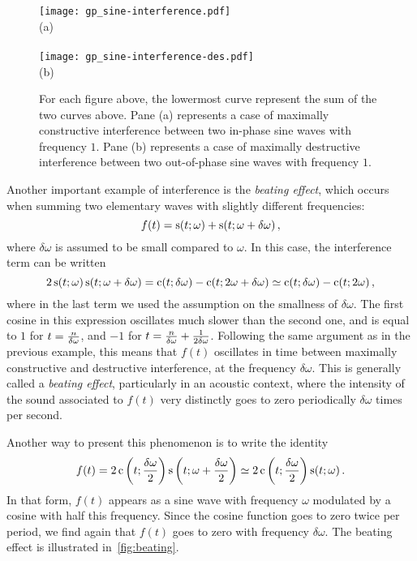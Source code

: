 \begin{figure}[ph!]
  \centering
  \texttt{[image: gp\_sine-interference.pdf]}
  \\\hspace{0.2cm}(a)\\~\\
  \texttt{[image: gp\_sine-interference-des.pdf]}
  \\\hspace{0.2cm}(b)\\
  \caption{For each figure above, the lowermost curve represent the sum of the two curves
    above. Pane (a) represents a case of maximally constructive interference between two
    in-phase sine waves with frequency $1$. Pane (b) represents a case of maximally
  destructive interference between two out-of-phase sine waves with frequency $1$.}
  \label{fig:interference}
\end{figure}
\begin{example}
  Another important example of interference is the \emph{beating effect}, which occurs
  when summing two elementary waves with slightly different frequencies:
  \begin{equation}
    f(t)=\operatorname{s}(t;\omega)+\operatorname{s}(t;\omega+\delta\omega)\,,
  \end{equation}
  where $\delta\omega$ is assumed to be small compared to $\omega$. In this case, the
  interference term can be written
  \begin{equation}
    2\operatorname{s}(t;\omega)\operatorname{s}(t;\omega+\delta\omega)=\operatorname{c}(t;\delta\omega)-\operatorname{c}(t;2\omega+\delta\omega)
    \simeq \operatorname{c}(t;\delta\omega)-\operatorname{c}(t;2\omega)\,,
  \end{equation}
  where in the last term we used the assumption on the smallness of $\delta\omega$. The
  first cosine in this expression oscillates much slower than the second one, and is equal
  to $1$ for $t=\smash{\frac{n}{\delta\omega}}$, and $-1$ for
  $t=\smash{\frac{n}{\delta\omega}+\frac{1}{2\delta\omega}}$. Following the same argument
  as in the previous example, this means that $f(t)$ oscillates in time between maximally
  constructive and destructive interference, at the frequency $\delta\omega$. This is
  generally called a \emph{beating effect}, particularly in an acoustic context, where the
  intensity of the sound associated to $f(t)$ very distinctly goes to zero periodically
  $\delta\omega$ times per second.

  Another way to present this phenomenon is to write the identity
  \begin{equation}
    f(t)=2\operatorname{c}\left(t;\frac{\delta\omega}{2}\right)
    \operatorname{s}\left(t;\omega+\frac{\delta\omega}{2}\right)
    \simeq 2\operatorname{c}\left(t;\frac{\delta\omega}{2}\right)\operatorname{s}(t;\omega)\,.
  \end{equation}
  In that form, $f(t)$ appears as a sine wave with frequency $\omega$ modulated by a
  cosine with half this frequency. Since the cosine function goes to zero twice per
  period, we find again that $f(t)$ goes to zero with frequency $\delta\omega$. The
  beating effect is illustrated in~\cref{fig:beating}.
\end{example}
